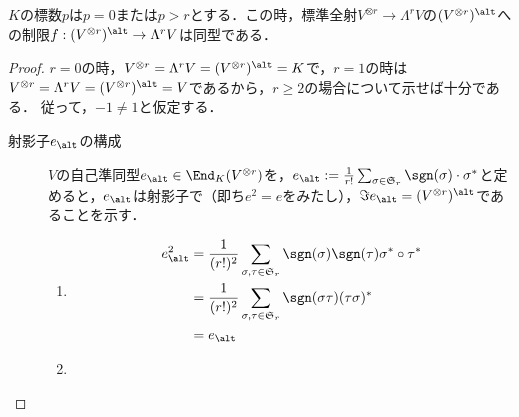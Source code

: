 \documentclass[uplatex, dvipdfmx]{jsreport}
\begin{document}
\begin{proposition}[alternizer]
    $K$の標数$p$は$p=0$または$p>r$とする．この時，標準全射$V^{\otimes r}\to\Lambda^rV$の$(V^{\otimes r})^\alt$への制限$f:(V^{\otimes r})^\alt\to\Lambda^rV$は同型である．
\end{proposition}
\begin{proof}
    $r=0$の時，$V^{\otimes r}=\Lambda^rV=(V^{\otimes r})^\alt=K$で，$r=1$の時は$V^{\otimes r}=\Lambda^rV=(V^{\otimes r})^\alt=V$であるから，$r\ge 2$の場合について示せば十分である．
    従って，$-1\ne 1$と仮定する．
    \begin{description}
        \item[射影子$e_\alt$の構成] 
        $V$の自己準同型$e_\alt\in\End_K(V^{\otimes r})$を，$e_\alt:=\frac{1}{r!}\sum_{\sigma\in\mathfrak{S}_r}\sgn(\sigma)\cdot \sigma^*$と定めると，$e_{\alt}$は射影子で（即ち$e^2=e$をみたし），$\Im e_\alt=(V^{\otimes r})^\alt$であることを示す．
        \begin{enumerate}
            \item \begin{align*}
                e^2_\alt&=\frac{1}{(r!)^2}\sum_{\sigma,\tau\in\mathfrak{S}_r}\sgn(\sigma)\sgn(\tau)\sigma^*\circ\tau^*\\
                &=\frac{1}{(r!)^2}\sum_{\sigma,\tau\in\mathfrak{S}_r}\sgn(\sigma\tau)(\tau\sigma)^*\\
                &=e_\alt
            \end{align*}
            \item 
        \end{enumerate}
    \end{description}
\end{proof}
\end{document}
